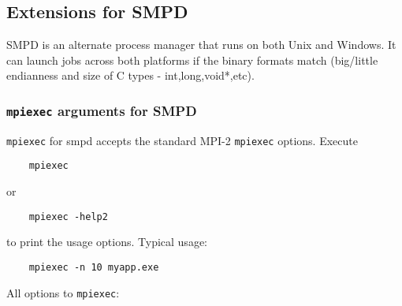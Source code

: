 \documentclass[dvipdfm,11pt]{article}
\begin{document}
\subsection{Extensions for SMPD}
\label{sec:extensions-smpd}

SMPD is an alternate process manager that runs on both Unix and Windows.
It can launch jobs across both platforms if the binary formats match 
(big/little endianness and size of C types - int,long,void*,etc).


\subsubsection{\texttt{mpiexec} arguments for SMPD}
\label{sec:mpiexec-smpd}

\texttt{mpiexec} for smpd accepts the standard MPI-2 \texttt{mpiexec}
options.  Execute
\begin{verbatim}
    mpiexec
\end{verbatim}
or
\begin{verbatim}
    mpiexec -help2
\end{verbatim}
to print the usage options.  Typical usage:
\begin{verbatim}
    mpiexec -n 10 myapp.exe
\end{verbatim}
All options to \texttt{mpiexec}:
\end{document}
